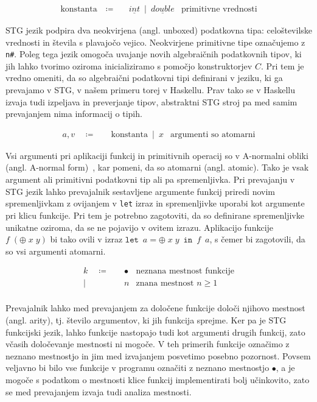 \begin{align*}
	\text{konstanta} \quad \coloneq& \quad \underline{int} \enspace \vert \enspace \underline{double} & \text{primitivne vrednosti}
\end{align*}

STG jezik podpira dva neokvirjena (angl. unboxed) podatkovna tipa: celoštevilske vrednosti in števila s plavajočo vejico. Neokvirjene primitivne tipe označujemo z \texttt{n\#}. Poleg tega jezik omogoča uvajanje novih algebraičnih podatkovnih tipov, ki jih lahko tvorimo oziroma inicializiramo s pomočjo konstruktorjev $C$. Pri tem je vredno omeniti, da so algebraični podatkovni tipi definirani v jeziku, ki ga prevajamo v STG, v našem primeru torej v Haskellu. Prav tako se v Haskellu izvaja tudi izpeljava in preverjanje tipov, abstraktni STG stroj pa med samim prevajanjem nima informacij o tipih.

\begin{align*}
	a, v \quad \coloneq& \quad \text{konstanta} \enspace \vert \enspace x & \text{argumenti so atomarni}
\end{align*}

Vsi argumenti pri aplikaciji funkcij in primitivnih operacij so v A-normalni obliki (angl. A-normal form)~\cite{flanagan1993essence}, kar pomeni, da so atomarni (angl. atomic). Tako je vsak argument ali primitivni podatkovni tip ali pa spremenljivka. Pri prevajanju v STG jezik lahko prevajalnik sestavljene argumente funkcij priredi novim spremenljivkam z ovijanjem v \texttt{let} izraz in spremenljivke uporabi kot argumente pri klicu funkcije. Pri tem je potrebno zagotoviti, da so definirane spremenljivke unikatne oziroma, da se ne pojavijo v ovitem izrazu. Aplikacijo funkcije $f \; (\oplus \; x \; y)$ bi tako ovili v  izraz $\texttt{let} \enspace a = \oplus \; x \; y \enspace \texttt{in} \enspace f \enspace a$, s čemer bi zagotovili, da so vsi argumenti atomarni.

\begin{align*}
	k \quad \coloneq& \quad \bullet & \text{neznana mestnost funkcije}\\
	\vert& \quad n & \text{znana mestnost $n \geq 1$}\\
\end{align*}

Prevajalnik lahko med prevajanjem za določene funkcije določi njihovo mestnost (angl. arity), tj. število argumentov, ki jih funkcija sprejme. Ker pa je STG funkcijski jezik, lahko funkcije nastopajo tudi kot argumenti drugih funkcij, zato včasih določevanje mestnosti ni mogoče. V teh primerih funkcije označimo z neznano mestnostjo in jim med izvajanjem posvetimo posebno pozornost. Povsem veljavno bi bilo vse funkcije v programu označiti z neznano mestnostjo $\bullet$, a je mogoče s podatkom o mestnosti klice funkcij implementirati bolj učinkovito, zato se med prevajanjem izvaja tudi analiza mestnosti.

